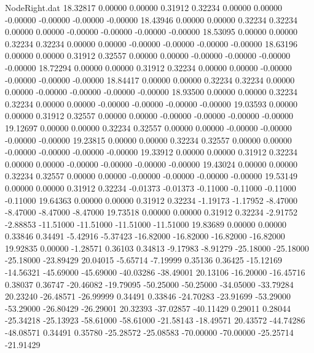 \begin{filecontents}{NodeRight.dat}
  18.32817    0.00000    0.00000     0.31912    0.32234    0.00000    0.00000   -0.00000   -0.00000   -0.00000   -0.00000
  18.43946    0.00000    0.00000     0.32234    0.32234    0.00000    0.00000   -0.00000   -0.00000   -0.00000   -0.00000
  18.53095    0.00000    0.00000     0.32234    0.32234    0.00000    0.00000   -0.00000   -0.00000   -0.00000   -0.00000
  18.63196    0.00000    0.00000     0.31912    0.32557    0.00000    0.00000   -0.00000   -0.00000   -0.00000   -0.00000
  18.72294    0.00000    0.00000     0.31912    0.32234    0.00000    0.00000   -0.00000   -0.00000   -0.00000   -0.00000
  18.84417    0.00000    0.00000     0.32234    0.32234    0.00000    0.00000   -0.00000   -0.00000   -0.00000   -0.00000
  18.93500    0.00000    0.00000     0.32234    0.32234    0.00000    0.00000   -0.00000   -0.00000   -0.00000   -0.00000
  19.03593    0.00000    0.00000     0.31912    0.32557    0.00000    0.00000   -0.00000   -0.00000   -0.00000   -0.00000
  19.12697    0.00000    0.00000     0.32234    0.32557    0.00000    0.00000   -0.00000   -0.00000   -0.00000   -0.00000
  19.23815    0.00000    0.00000     0.32234    0.32557    0.00000    0.00000   -0.00000   -0.00000   -0.00000   -0.00000
  19.33912    0.00000    0.00000     0.31912    0.32234    0.00000    0.00000   -0.00000   -0.00000   -0.00000   -0.00000
  19.43024    0.00000    0.00000     0.32234    0.32557    0.00000    0.00000   -0.00000   -0.00000   -0.00000   -0.00000
  19.53149    0.00000    0.00000     0.31912    0.32234   -0.01373   -0.01373   -0.11000   -0.11000   -0.11000   -0.11000
  19.64363    0.00000    0.00000     0.31912    0.32234   -1.19173   -1.17952   -8.47000   -8.47000   -8.47000   -8.47000
  19.73518    0.00000    0.00000     0.31912    0.32234   -2.91752   -2.88853  -11.51000  -11.51000  -11.51000  -11.51000
  19.83689    0.00000    0.00000     0.33846    0.34491   -5.42916   -5.37423  -16.82000  -16.82000  -16.82000  -16.82000
  19.92835    0.00000   -1.28571     0.36103    0.34813   -9.17983   -8.91279  -25.18000  -25.18000  -25.18000  -23.89429
  20.04015   -5.65714   -7.19999     0.35136    0.36425  -15.12169  -14.56321  -45.69000  -45.69000  -40.03286  -38.49001
  20.13106  -16.20000  -16.45716     0.38037    0.36747  -20.46082  -19.79095  -50.25000  -50.25000  -34.05000  -33.79284
  20.23240  -26.48571  -26.99999     0.34491    0.33846  -24.70283  -23.91699  -53.29000  -53.29000  -26.80429  -26.29001
  20.32393  -37.02857  -40.11429     0.29011    0.28044  -25.34218  -25.13923  -58.61000  -58.61000  -21.58143  -18.49571
  20.43572  -44.74286  -48.08571     0.34491    0.35780  -25.28572  -25.08583  -70.00000  -70.00000  -25.25714  -21.91429

\end{filecontents}
